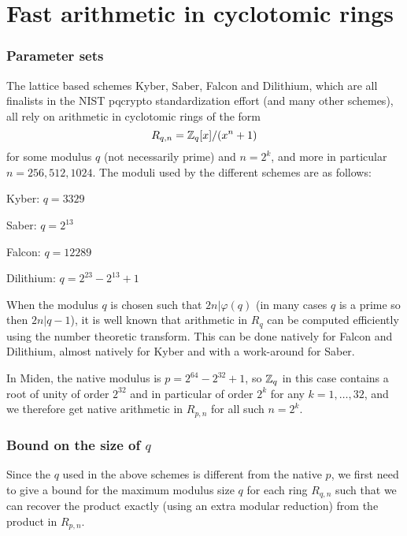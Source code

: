 \section{Fast arithmetic in cyclotomic rings}


\subsubsection{Parameter sets}

The lattice based schemes Kyber, Saber, Falcon and Dilithium, which are all finalists in the NIST pqcrypto standardization
effort (and many other schemes), all rely on arithmetic in cyclotomic rings of the form
\[  R_{q,n} = \mathbb{Z}_q[x]/(x^n + 1)    \]
for some modulus $q$ (not necessarily prime) and $n = 2^k$, and more in particular $n = 256, 512, 1024$.
The moduli used by the different schemes are as follows:
\bit
\item Kyber: $q = 3329$
\item Saber: $q = 2^{13}$
\item Falcon: $q = 12289$
\item Dilithium: $q = 2^{23} - 2^{13} + 1$
\eit

When the modulus $q$ is chosen such that $2n | \varphi(q)$ (in many cases $q$ is a prime so then $2n | q-1$), 
it is well known that arithmetic in $R_q$ can be computed efficiently using the number theoretic transform.
This can be done natively for Falcon and Dilithium, almost natively for Kyber and with a work-around for Saber.

In Miden, the native modulus is $p = 2^{64} - 2^{32} + 1$, so $\mathbb{Z}_q$ in this case contains a root of unity 
of order $2^{32}$ and in particular of order $2^k$ for any $k = 1, \ldots, 32$, and we therefore get native
arithmetic in $R_{p,n}$ for all such $n = 2^k$.

\subsubsection{Bound on the size of $q$}

Since the $q$ used in the above schemes is different from the native $p$, we first need to give a bound for
the maximum modulus size $q$ for each ring $R_{q,n}$ such that we can recover the product exactly (using 
an extra modular reduction) from the product in $R_{p,n}$.

